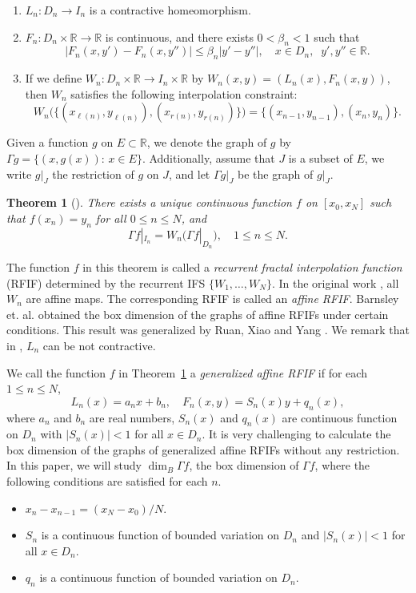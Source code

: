 \documentclass[11pt]{amsart}
\newtheorem{thm}{Theorem}[section]
\theoremstyle{definition}
\theoremstyle{remark}
\numberwithin{equation}{section}
\newcommand{\bR}{{\mathbb R}}
\begin{document}
\begin{enumerate}
	\item $ L_n: D_n \to I_n $ is a contractive homeomorphism.
	\item $ F_n: D_n \times \mathbb{R} \to \mathbb{R} $ is continuous, and there exists $ 0 < \beta_n < 1 $ such that
	$$|F_n(x, y') - F_n(x, y'')| \leq \beta_n |y' - y''|, \quad x \in D_n, \;\; y', y'' \in \mathbb{R}.$$
	\item If we define $ W_{n}: D_n \times \mathbb{R} \to I_n \times \mathbb{R} $ by
	$W_{n}(x, y) = ( L_n(x), F_n(x, y))$, then
   $W_n$ satisfies the following interpolation constraint: 
	\[ 
	W_{n}\big(\{(x_{\ell(n)}, y_{\ell(n)}), (x_{r(n)}, y_{r(n)}) \}\big)= \{(x_{n-1}, y_{n-1}), (x_n, y_n)\}.
	\]
\end{enumerate}


Given a function $g$ on $E \subset\bR$, we denote the graph of $g$ by $\Gamma g=\{(x, g(x)):\, x \in E\}$. Additionally, assume that $J$ is a subset of $E$, we write $g|_J$ the restriction of $g$ on $J$, and let $\Gamma g|_{J}$ be the graph of $g|_{J}$.

\begin{thm}[\cite{BEH89,RXY21}]\label{thm:existence}
	There exists a unique continuous function $f$ on $[x_0, x_N]$ such that $ f(x_n) = y_n $ for all $0 \leq n \leq N $, and 
	\begin{equation}\label{eq:rfif}
		\Gamma f|_{I_n} = W_{n} \big( \Gamma f|_{D_n} \big), \quad  1 \leq n \leq N.
	\end{equation}
\end{thm}

The function $f$ in this theorem is called a \emph{recurrent fractal interpolation function} (RFIF) determined by the recurrent IFS $\{W_1,\ldots,W_N\}$. In the original work \cite{BEH89}, all $W_n$ are affine maps. The corresponding RFIF is called an \emph{affine RFIF}. Barnsley et. al. \cite{BEH89} obtained the box dimension of the graphs of affine RFIFs under certain conditions. This result was generalized by Ruan, Xiao and Yang \cite{RXY21}. We remark that in \cite{RXY21}, $L_n$ can be not contractive.

We call the function $f$ in Theorem~\ref{thm:existence} a \emph{generalized affine RFIF} if for each $1\leq n\leq N$,
\[
  L_n(x)=a_n x+b_n, \quad F_n(x,y)= S_n(x)y + q_n(x),
\]
where $a_n$ and $b_n$ are real numbers, $S_n(x)$ and $q_n(x)$ are continuous function on $D_n$ with $|S_n(x)|<1$ for all $x\in D_n$. 
It is very challenging to calculate the box dimension of the graphs of generalized affine RFIFs without any restriction. In this paper, we will study $\dim_B \Gamma f$, the box dimension of $\Gamma f$, where the following conditions are satisfied for each $n$.
\begin{itemize}
	\item[(A1)] $x_n-x_{n-1}=(x_N-x_0)/N$.
	\item[(A2)] $S_n$ is a continuous function of bounded variation on $D_n$ and $|S_n(x)|<1$ for all $x\in D_n$.
	\item[(A3)] $q_n$ is a continuous function of bounded variation on $D_n$.
\end{itemize}
\end{document}
